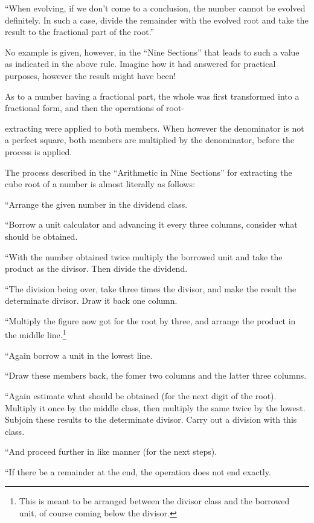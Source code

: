 \documentclass[11pt]{article}
\newcommand{\scanpage}[2]{\clearpage\setcounter{footnote}{0}\noindent{\footnotesize\color{gray}PDF page #1 · #2}\par\medskip}
\newcommand{\scanfooter}{}
\begin{document}
``When evolving, if we don't come to a conclusion, the number cannot be evolved definitely. In such a case, divide the remainder with the evolved root and take the result to the fractional part of the root.''

No example is given, however, in the ``Nine Sections'' that leads to such a value as indicated in the above rule. Imagine how it had answered for practical purposes, however the result might have been!

As to a number having a fractional part, the whole was first transformed into a fractional form, and then the operations of root-
\scanfooter

\scanpage{0028}{Chapter 3, printed page 14}
\setcounter{footnote}{0}
extracting were applied to both members. When however the denominator is not a perfect square, both members are multiplied by the denominator, before the process is applied.

The process described in the ``Arithmetic in Nine Sections'' for extracting the cube root of a number is almost literally as follows:

``Arrange the given number in the dividend class.

``Borrow a unit calculator and advancing it every three columns, consider what should be obtained.

``With the number obtained twice multiply the borrowed unit and take the product as the divisor. Then divide the dividend.

``The division being over, take three times the divisor, and make the result the determinate divisor. Draw it back one column.

``Multiply the figure now got for the root by three, and arrange the product in the middle line.\footnote{This is meant to be arranged between the divisor class and the borrowed unit, of course coming below the divisor.}

``Again borrow a unit in the lowest line.

``Draw these members back, the fomer two columns and the latter three columns.

``Again estimate what should be obtained (for the next digit of the root). Multiply it once by the middle class, then multiply the same twice by the lowest. Subjoin these results to the determinate divisor. Carry out a division with this class.

``And proceed further in like manner (for the next steps).

``If there be a remainder at the end, the operation does not end exactly.
\end{document}
